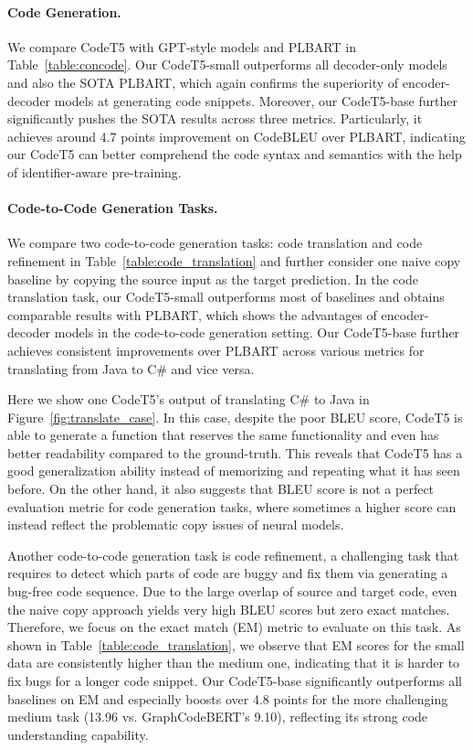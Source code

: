 \documentclass[11pt]{article}
\begin{document}
\vspace{-0.5em}
\paragraph{Code Generation.} 
We compare CodeT5 with GPT-style models and PLBART in Table~\ref{table:concode}. 
Our CodeT5-small outperforms all decoder-only models and also the SOTA PLBART, which again confirms the superiority of encoder-decoder models at generating code snippets. Moreover, our CodeT5-base further significantly pushes the SOTA results across three metrics. Particularly, it achieves   around 4.7 points improvement on CodeBLEU over PLBART, indicating  our CodeT5 can better comprehend the code syntax and semantics with the help of identifier-aware pre-training. 


\vspace{-0.5em}
\paragraph{Code-to-Code Generation Tasks.} 
We compare two  code-to-code generation tasks: code translation and code refinement in Table~\ref{table:code_translation} and further consider one naive copy baseline by copying the source input as the target prediction.
In the code translation task, our CodeT5-small outperforms most of baselines and obtains comparable results with PLBART, which shows the advantages of encoder-decoder models in the code-to-code generation setting. Our CodeT5-base further achieves consistent  improvements over PLBART across various metrics for translating from Java to C\# and vice versa.

Here we show   one CodeT5's output of translating C\# to Java in Figure~\ref{fig:translate_case}.
In this case, despite the poor BLEU score,  CodeT5 is able to generate a function that reserves the same functionality and even has better readability compared to the ground-truth.
This reveals that  CodeT5 has a good generalization ability instead of memorizing and repeating what it has seen before.
On the other hand, it also  
suggests that BLEU score is not a perfect evaluation metric for code generation tasks, where sometimes  a higher score can instead reflect the problematic copy issues of neural models.

Another code-to-code generation task is code refinement, a challenging task  that requires to detect which parts of code are buggy and fix them via generating a bug-free code sequence.
Due to the large overlap of source and target code, even the naive copy approach yields very high BLEU scores but zero exact matches. Therefore, we focus on the exact match (EM) metric to evaluate on this task. As shown in Table~\ref{table:code_translation}, we observe that EM scores for the small data are consistently higher than the medium one, indicating that it is harder to fix bugs for a longer code snippet. Our CodeT5-base significantly outperforms  all baselines on EM and especially boosts over 4.8 points for the more challenging medium  task (13.96 vs. GraphCodeBERT's 9.10), reflecting its strong code understanding capability.
\end{document}
